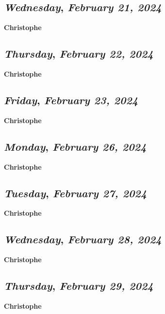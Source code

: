\def\day{\textit{February 21, 2024}}
\def\weekday{\textit{Wednesday}}
\subsection*{\weekday, \day}
\textbf {Christophe}

\def\day{\textit{February 22, 2024}}
\def\weekday{\textit{Thursday}}
\subsection*{\weekday, \day}
\textbf {Christophe}

\def\day{\textit{February 23, 2024}}
\def\weekday{\textit{Friday}}
\subsection*{\weekday, \day}
\textbf {Christophe}

\def\day{\textit{February 26, 2024}}
\def\weekday{\textit{Monday}}
\subsection*{\weekday, \day}
\textbf {Christophe}

\def\day{\textit{February 27, 2024}}
\def\weekday{\textit{Tuesday}}
\subsection*{\weekday, \day}
\textbf {Christophe}

\def\day{\textit{February 28, 2024}}
\def\weekday{\textit{Wednesday}}
\subsection*{\weekday, \day}
\textbf {Christophe}

\def\day{\textit{February 29, 2024}}
\def\weekday{\textit{Thursday}}
\subsection*{\weekday, \day}
\textbf {Christophe}